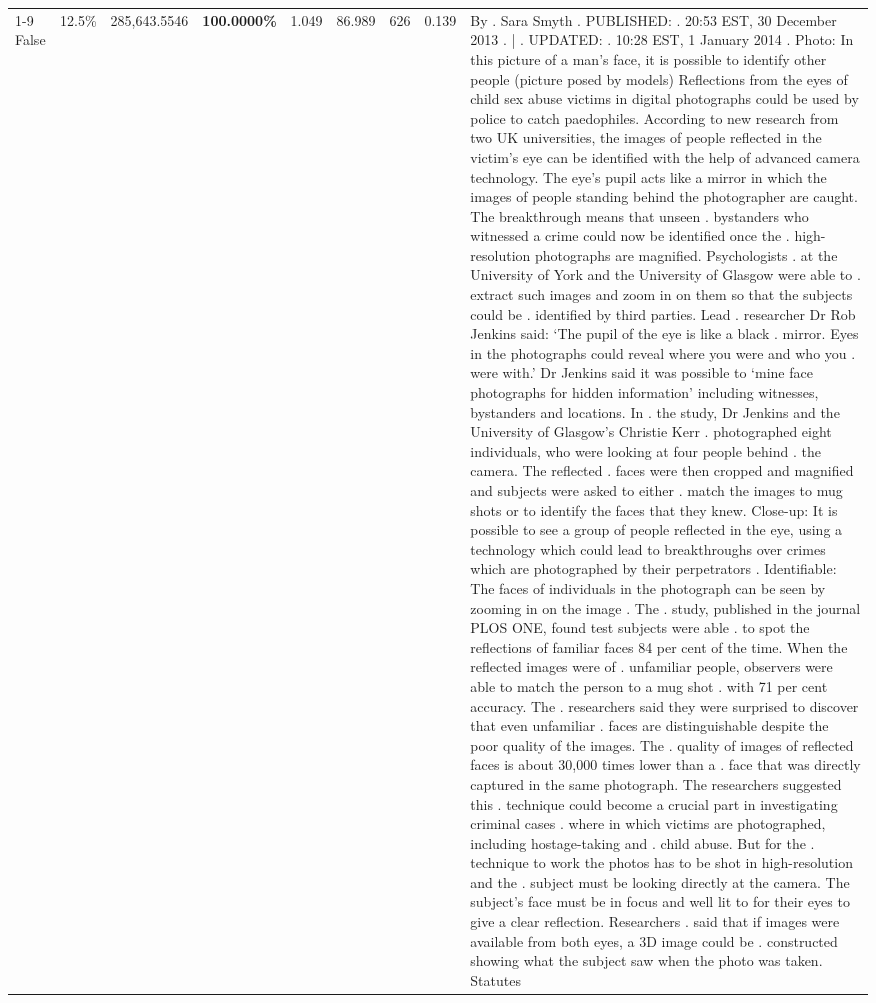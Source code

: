 \begin{table}[H]
\begin{tabular}{lllrlllll}
\cline{1-9} \cline{2-9}
False & 12.5\% & \color{red} 285,643.5546 & \bfseries \color{red} 100.0000\% & 1.049 & 86.989 & 626 & 0.139 & By . Sara Smyth . PUBLISHED: . 20:53 EST, 30 December 2013 . | . UPDATED: . 10:28 EST, 1 January 2014 . Photo: In this picture of a man's face, it is possible to identify other people (picture posed by models) Reflections from the eyes of child sex abuse victims in digital photographs could be used by police to catch paedophiles. According to new research from two UK universities, the images of people reflected in the victim's eye can be identified with the help of advanced camera technology. The eye's pupil acts like a mirror in which the images of people standing behind the photographer are caught. The breakthrough means that unseen . bystanders who witnessed a crime could now be identified once the . high-resolution photographs are magnified. Psychologists . at the University of York and the University of Glasgow were able to . extract such images and zoom in on them so that the subjects could be . identified by third parties. Lead . researcher Dr Rob Jenkins said: ‘The pupil of the eye is like a black . mirror. Eyes in the photographs could reveal where you were and who you . were with.' Dr Jenkins said it was possible to ‘mine face photographs for hidden information' including witnesses, bystanders and locations. In . the study, Dr Jenkins and the University of Glasgow's Christie Kerr . photographed eight individuals, who were looking at four people behind . the camera. The reflected . faces were then cropped and magnified and subjects were asked to either . match the images to mug shots or to identify the faces that they knew. Close-up: It is possible to see a group of people reflected in the eye, using a technology which could lead to breakthroughs over crimes which are photographed by their perpetrators . Identifiable: The faces of individuals in the photograph can be seen by zooming in on the image . The . study, published in the journal PLOS ONE, found test subjects were able . to spot the reflections of familiar faces 84 per cent of the time. When the reflected images were of . unfamiliar people, observers were able to match the person to a mug shot . with 71 per cent accuracy. The . researchers said they were surprised to discover that even unfamiliar . faces are distinguishable despite the poor quality of the images. The . quality of images of reflected faces is about 30,000 times lower than a . face that was directly captured in the same photograph. The researchers suggested this . technique could become a crucial part in investigating criminal cases . where in which victims are photographed, including hostage-taking and . child abuse. But for the . technique to work the photos has to be shot in high-resolution and the . subject must be looking directly at the camera. The subject's face must be in focus and well lit to for their eyes to give a clear reflection. Researchers . said that if images were available from both eyes, a 3D image could be . constructed showing what the subject saw when the photo was taken. Statutes \\

\end{tabular}
\end{table}
